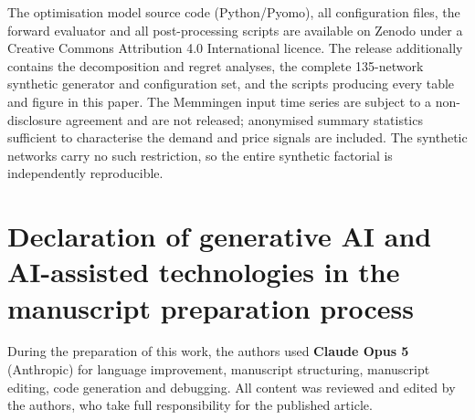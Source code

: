 The optimisation model source code (Python/Pyomo), all configuration files, the forward
evaluator and all post-processing scripts are available on Zenodo
\citep{ruess_2026_calion} under a Creative Commons Attribution 4.0 International licence.
The release additionally contains the decomposition and regret
analyses, the complete 135-network synthetic generator and configuration set, and the
scripts producing every table and figure in this paper. The Memmingen input time series
are subject to a non-disclosure agreement and are not released; anonymised summary
statistics sufficient to characterise the demand and price signals are included. The
synthetic networks carry no such restriction, so the entire synthetic factorial is
independently reproducible.

\section*{Declaration of generative AI and AI-assisted technologies in the manuscript
preparation process}

During the preparation of this work, the authors used \textbf{Claude Opus 5} (Anthropic)
for language improvement, manuscript structuring, manuscript editing, code generation and debugging. All content was reviewed and edited by the authors, who take full responsibility for the published article.
